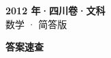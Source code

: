 \documentclass[zihao=-4, a4paper]{ctexart}
\begin{document}
\begin{center}
  {\Large\bfseries 2012 年·四川卷·文科}\\[4pt]
  {\large 数学 · 简答版}
\end{center}
\medskip
{}

\clearpage
{}
\begin{center}{\Large\bfseries 答案速查}\end{center}
\medskip

\end{document}
